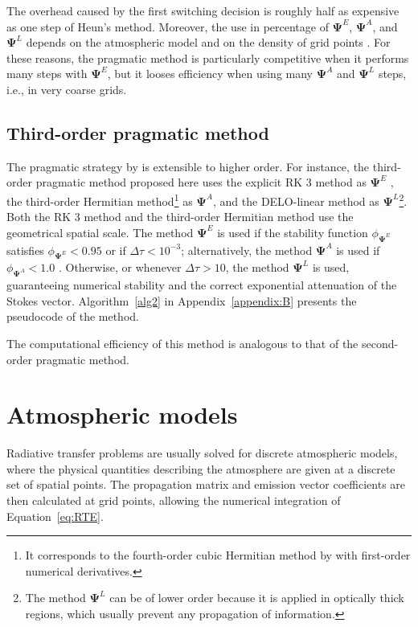 \documentclass[iop,numberedappendix,twocolappendix,twocolumn]{emulateapj}
\begin{document}
The overhead caused by the first switching decision is roughly half as expensive as one step of Heun's method.
Moreover, the use in percentage of $\mathbf{\Psi}^E$, $\mathbf{\Psi}^A$, and $\mathbf{\Psi}^L$
depends on the atmospheric model and on the density of grid points \citep[see][Table 2]{janett2018a}.
For these reasons, the pragmatic method is particularly competitive when it performs many steps with $\mathbf{\Psi}^E$,
but it looses efficiency when using many $\mathbf{\Psi}^A$ and $\mathbf{\Psi}^L$ steps, i.e., in very coarse grids.
%
\subsection{Third-order pragmatic method}
%
The pragmatic strategy by \citet{janett2018a} is extensible to higher order.
For instance, the third-order pragmatic method proposed here uses the explicit
RK 3 method as $\mathbf{\Psi}^E$ \citep[e.g.,][]{hairer2000},
the third-order Hermitian method\footnote{It corresponds
to the fourth-order cubic Hermitian method by \citet{bellot_rubio+al1998} with first-order numerical derivatives.} as $\mathbf{\Psi}^A$,
and the DELO-linear method  as $\mathbf{\Psi}^L$\footnote{The method
$\mathbf{\Psi}^L$ can be of lower order because it is applied in optically thick regions, which usually prevent any propagation of information.}.
Both the RK 3 method and the third-order Hermitian method use the geometrical spatial scale.
The method $\mathbf{\Psi}^E$ is used if the stability function $\phi_{\mathbf{\Psi}^E}$ \citep{frank2008} satisfies $\phi_{\mathbf{\Psi}^E}<0.95$
or if $\Delta\tau<10^{-3}$;
alternatively, the method $\mathbf{\Psi}^A$ is used if $\phi_{\mathbf{\Psi}^A}<1.0$ \citep[see][]{janett2017b}.
Otherwise, or whenever $\Delta\tau>10$, the method $\mathbf{\Psi}^L$ is used,
guaranteeing numerical stability and the correct exponential attenuation of the Stokes vector.
Algorithm~\ref{alg2} in Appendix~\ref{appendix:B} presents the pseudocode of the method.

The computational efficiency of this method is analogous to that of the second-order pragmatic method.
\section{Atmospheric models}\label{sec:sec2}
%
Radiative transfer problems are usually solved for discrete atmospheric models,
where the physical quantities describing the atmosphere are given at a discrete set of spatial points.
The propagation matrix and emission vector coefficients are then calculated at grid points, allowing the numerical integration of Equation~\eqref{eq:RTE}.
\end{document}
